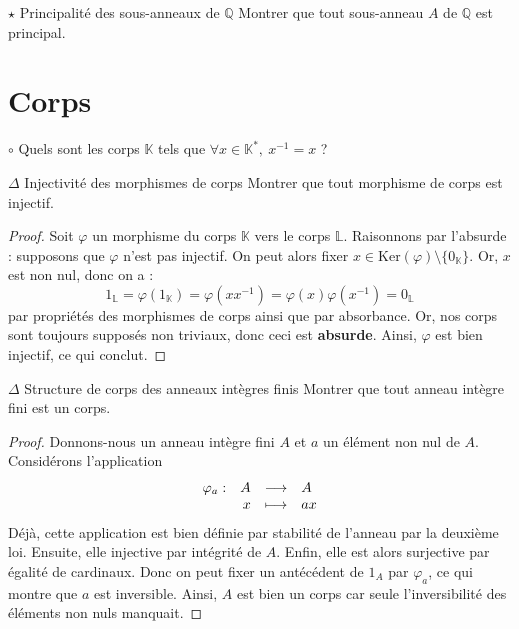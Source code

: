 \documentclass[french,a4paper]{article}
\newcommand{\Q}{\mathbb{Q}}
\newcommand{\K}{\mathbb{K}}
\renewcommand{\L}{\mathbb{L}}
\newcommand{\st}{^*}
\newcommand{\inv}{^{-1}}
\renewcommand{\ker}{\text{Ker}}
\theoremstyle{plain}
\theoremstyle{definition}
\theoremstyle{remark}
\begin{document}
\begin{ex}{$\star$ Principalité des sous-anneaux de $\Q$}
	Montrer que tout sous-anneau $A$ de $\Q$ est principal.
\end{ex}

\section{Corps}

\begin{ex}[Moulin.AG.43]{$\circ$}
	Quels sont les corps $\K$ tels que $\forall x\in\K\st,\ x\inv=x$ ?
\end{ex}

\begin{ex}[Morlot]{$\Delta$ Injectivité des morphismes de corps}
	Montrer que tout morphisme de corps est injectif.
\end{ex}

\begin{proof}
	Soit $\varphi$ un morphisme du corps $\K$ vers le corps $\L$. Raisonnons par l'absurde : supposons que $\varphi$ n'est pas injectif. On peut alors fixer $x \in \ker(\varphi) \setminus \{0_\K\}$. Or, $x$ est non nul, donc on a : $$1_\L=\varphi(1_\K)=\varphi(xx\inv)=\varphi(x)\varphi(x\inv)=0_\L$$ par propriétés des morphismes de corps ainsi que par absorbance. Or, nos corps sont toujours supposés non triviaux, donc ceci est \textbf{absurde}. Ainsi, $\varphi$ est bien injectif, ce qui conclut.
\end{proof}

\begin{ex}[Morlot]{$\Delta$ Structure de corps des anneaux intègres finis}
	Montrer que tout anneau intègre fini est un corps.
\end{ex}

\begin{proof}
	Donnons-nous un anneau intègre fini $A$ et $a$ un élément non nul de $A$. Considérons l'application
	$$
	\begin{array}[t]{lrcl}
		\varphi_a : & A & \longrightarrow & A \\
		& x & \longmapsto & ax
	\end{array}
	$$
	Déjà, cette application est bien définie par stabilité de l'anneau par la deuxième loi. Ensuite, elle injective par intégrité de $A$. Enfin, elle est alors surjective par égalité de cardinaux. Donc on peut fixer un antécédent de $1_A$ par $\varphi_a$, ce qui montre que $a$ est inversible. Ainsi, $A$ est bien un corps car seule l'inversibilité des éléments non nuls manquait.
\end{proof}
\end{document}
